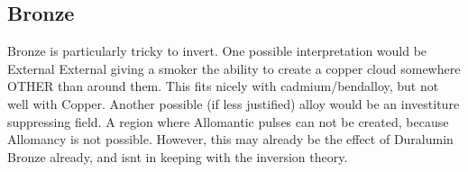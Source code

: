 \documentclass[conference]{IEEEtran}
\begin{document}
\subsection*{Bronze}
Bronze is particularly tricky to invert.  One possible interpretation would be External External giving a smoker the ability to create a copper cloud somewhere OTHER than around them.  This fits nicely with cadmium/bendalloy, but not well with Copper.
Another possible (if less justified) alloy would be an investiture suppressing field.  A region where Allomantic pulses can not be created, because Allomancy is not possible.  However, this may already be the effect of Duralumin Bronze already, and isnt in keeping with the inversion theory.
\newpage{}
{}

\end{document}
